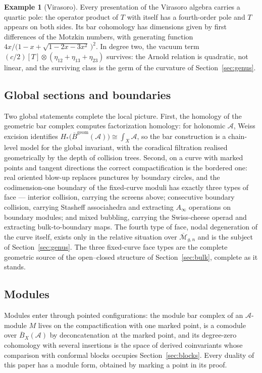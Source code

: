 \documentclass[11pt]{amsart}
\numberwithin{equation}{section}
\theoremstyle{plain}
\theoremstyle{definition}
\newtheorem{example}[theorem]{Example}
\theoremstyle{remark}
\newcommand{\cA}{\mathcal{A}}
\newcommand{\cM}{\mathcal{M}}
\newcommand{\barB}{\overline{B}}
\newcommand{\Mbar}{\overline{\cM}}
\begin{document}
\begin{example}[Virasoro]\label{ex:vir}
Every presentation of the Virasoro algebra carries a quartic pole: the operator
product of $T$ with itself has a fourth-order pole and $T$ appears on both
sides. Its bar cohomology has dimensions given by first differences of the
Motzkin numbers, with generating function
$4x/\bigl(1-x+\sqrt{1-2x-3x^2}\,\bigr)^{2}$. In degree two, the vacuum
term $(c/2)[T]\otimes(\eta_{12}+\eta_{13}+\eta_{23})$ survives:
the Arnold relation is quadratic, not linear, and the surviving class is
the germ of the curvature of Section~\ref{sec:genus}.
\end{example}

\subsection{Global sections and boundaries}

Two global statements complete the local picture. First, the homology of
the geometric bar complex computes factorization homology: for holonomic
$\cA$, Weiss excision identifies
$H_{*}\bigl(\barB^{\mathrm{geom}}(\cA)\bigr)\cong\int_{X}\cA$, so the bar
construction is a chain-level model for the global invariant, with the
coradical filtration realised geometrically by the depth of collision
trees. Second, on a curve with marked points and tangent directions the
correct compactification is the bordered one: real oriented blow-up
replaces punctures by boundary circles, and the codimension-one boundary
of the fixed-curve moduli has exactly three types of face --- interior
collision, carrying the screens above; consecutive boundary collision,
carrying Stasheff associahedra and extracting $A_\infty$ operations on
boundary modules; and mixed bubbling, carrying the Swiss-cheese operad
and extracting bulk-to-boundary maps. The fourth type of face, nodal
degeneration of the curve itself, exists only in the relative situation
over $\Mbar_{g,n}$ and is the subject of Section~\ref{sec:genus}. The
three fixed-curve face types are the complete geometric source of the
open--closed structure of Section~\ref{sec:bulk}, complete as it
stands.

\subsection{Modules}

Modules enter through pointed configurations: the module bar complex
of an $\cA$-module $M$ lives on the compactification with one marked
point, is a comodule over $\barB_X(\cA)$ by deconcatenation at the
marked point, and its degree-zero cohomology with several insertions
is the space of derived coinvariants whose comparison with conformal
blocks occupies Section~\ref{sec:blocks}. Every duality of this paper
has a module form, obtained by marking a point in its proof.
\end{document}
